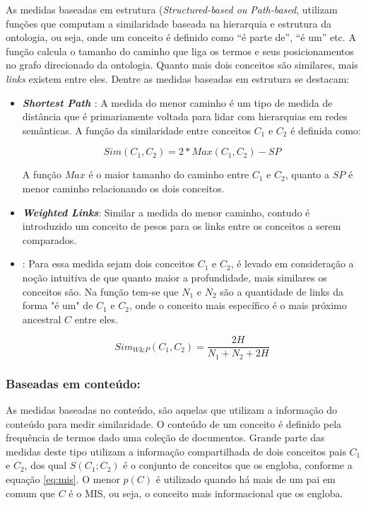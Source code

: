As medidas baseadas em estrutura (\textit{Structured-based ou Path-based}, utilizam funções que computam a similaridade baseada na hierarquia e estrutura da ontologia, ou seja, onde um conceito é definido como “é parte de”, “é um” etc. A função calcula o tamanho do caminho que liga os termos e seus posicionamentos no grafo direcionado da ontologia. Quanto mais dois conceitos são similares, mais \textit{links} existem entre eles. Dentre as medidas baseadas em estrutura se destacam:

\begin{itemize}
	\item{\textbf{\textit{Shortest Path} \citep{Rada:1989}}: A medida do menor caminho é um tipo de medida de distância que é primariamente voltada para lidar com hierarquias em redes semânticas. A função da similaridade entre conceitos $C_1$ e $C_2$ é definida como:

	\begin{equation}
		Sim(C_1, C_2) = 2 * Max(C_1, C_2) - SP	
	\label{eq:shortest_path}
	\end{equation}
	
	A função $Max$ é o maior tamanho do caminho entre $C_1$ e $C_2$, quanto a $SP$ é menor caminho relacionando os dois conceitos.}
	
	\item{\textbf{\textit{Weighted Links}}: Similar a medida do menor caminho, contudo é introduzido um conceito de pesos para os links entre os conceitos a serem comparados.}
	
	\item{\textbf{\cite{Wu:1994}}: Para essa medida sejam dois conceitos $C_1$ e $C_2$, é levado em consideração a noção intuitiva de que quanto maior a profundidade, mais similares os conceitos são. Na função tem-se que $N_1$ e $N_2$ são a quantidade de links da forma "é um" de $C_1$ e $C_2$, onde o conceito mais específico é o mais próximo ancestral  $C$ entre eles. 

	\begin{equation}
		Sim_{W \& P}(C_1, C_2) = \frac{2H}{N_1 + N_2 + 2H}	
	\label{eq:wu_palmer}
	\end{equation}	}	
\end{itemize}

\subsubsection{Baseadas em conteúdo:}

As medidas baseadas no conteúdo, são aquelas que utilizam a informação do conteúdo para medir similaridade. O conteúdo de um conceito é definido pela frequência de termos dado uma coleção de documentos. Grande parte das medidas deste tipo utilizam a informação compartilhada de dois conceitos pais $C_1$ e $C_2$, dos qual $S(C_1; C_2)$ é o conjunto de conceitos que os engloba, conforme a equação \ref{eq:mis}.  O menor $p(C)$ é utilizado quando há mais de um pai em comum que $C$ é o \ac{MIS}, ou seja, o conceito mais informacional que os engloba.

